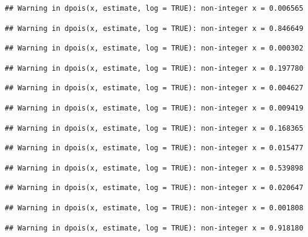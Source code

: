 \documentclass[]{article}
\begin{document}
\begin{verbatim}
## Warning in dpois(x, estimate, log = TRUE): non-integer x = 0.006565
\end{verbatim}

\begin{verbatim}
## Warning in dpois(x, estimate, log = TRUE): non-integer x = 0.846649
\end{verbatim}

\begin{verbatim}
## Warning in dpois(x, estimate, log = TRUE): non-integer x = 0.000302
\end{verbatim}

\begin{verbatim}
## Warning in dpois(x, estimate, log = TRUE): non-integer x = 0.197780
\end{verbatim}

\begin{verbatim}
## Warning in dpois(x, estimate, log = TRUE): non-integer x = 0.004627
\end{verbatim}

\begin{verbatim}
## Warning in dpois(x, estimate, log = TRUE): non-integer x = 0.009419
\end{verbatim}

\begin{verbatim}
## Warning in dpois(x, estimate, log = TRUE): non-integer x = 0.168365
\end{verbatim}

\begin{verbatim}
## Warning in dpois(x, estimate, log = TRUE): non-integer x = 0.015477
\end{verbatim}

\begin{verbatim}
## Warning in dpois(x, estimate, log = TRUE): non-integer x = 0.539898
\end{verbatim}

\begin{verbatim}
## Warning in dpois(x, estimate, log = TRUE): non-integer x = 0.020647
\end{verbatim}

\begin{verbatim}
## Warning in dpois(x, estimate, log = TRUE): non-integer x = 0.001808
\end{verbatim}

\begin{verbatim}
## Warning in dpois(x, estimate, log = TRUE): non-integer x = 0.918180
\end{verbatim}
\end{document}
